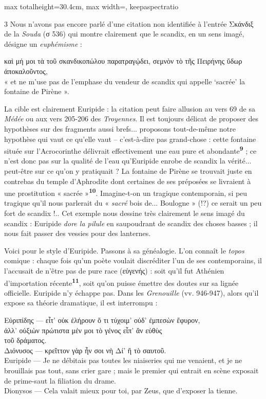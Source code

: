 \documentclass[11pt,twoside]{book}
\newcommand{\italique}[1]{\textit{#1}}
\newcommand{\citComm}[1]{\begin{quoting}[vskip=0.4pt,leftmargin=0.7em,rightmargin=0.2em]#1\end{quoting}}
\newlength{\larg}
\newcommand{\decalage}[1]{\settowidth{\larg}{#1}\hspace*{\larg}}
\newcommand{\marqueur}[1]{\textsuperscript{\color{rubricRed}\textbf{#1}}}
\begin{document}
\begin{adjustbox}{max totalheight=30.4cm, max width=\textwidth, keepaspectratio}
\begin{minipage}{\textwidth}
{\begin{multicols}{3}
\noindent Nous n'avons pas encore parlé d'une citation non identifiée à l'entrée Σκάνδιξ de la \italique{Souda} (σ 536) qui montre clairement que le scandix, en un sens imagé, désigne un \italique{euphémisme} :
\citComm{καὶ μή μοι τὰ τοῦ σκανδικοπώλου παρατραγῴδει, σεμνὸν τὸ τῆς Πειρήνης ὕδωρ ἀποκαλοῦντος,\\
« et ne m'use pas de l'emphase du vendeur de scandix qui appelle `sacrée' la fontaine de Pirène ».}
\par\vspace{1.5pt}
\noindent La cible est clairement Euripide : la citation peut faire allusion au vers 69 de sa \italique{Médée} ou aux vers 205-206 des \italique{Troyennes}. Il est toujours délicat de proposer des hypothèses sur des fragments aussi brefs... proposons tout-de-même notre hypothèse qui vaut ce qu'elle vaut – c'est-à-dire pas grand-chose : cette fontaine située sur l'Acrocorinthe délivrait effectivement une eau pure et abondante\marqueur{9} ; ce n'est donc pas sur la qualité de l'eau qu'Euripide enrobe de scandix la vérité... peut-être sur ce qu'on y pratiquait ? La fontaine de Pirène se trouvait juste en contrebas du temple d'Aphrodite dont certaines de ses préposées se livraient à une prostitution « sacrée »\marqueur{10}. Imagine-t-on un tragique contemporain, si peu tragique qu'il nous parlerait du « \italique{sacré} bois de... Boulogne » (!?) ce serait un peu fort de scandix !.. Cet exemple nous dessine très clairement le sens imagé du scandix : Euripide \italique{dore la pilule} en saupoudrant de scandix des choses basses ; il nous fait passer des vessies pour des lanternes.
\par\vspace{1.5pt}
\noindent Voici pour le style d'Euripide. Passons à sa généalogie. L'on connaît le \italique{topos} comique : chaque fois qu'un poète voulait discréditer l'un de ses contemporains, il l'accusait de n'être pas de pure race (εὐγενής) : soit qu'il fut Athénien d'importation récente\marqueur{11}, soit qu'on puisse émettre des doutes sur sa lignée officielle. Euripide n'y échappe pas. Dans les \italique{Grenouille} (vv. 946-947), alors qu'il expose sa théorie dramatique, il est interrompu :
\citComm{Εὐριπίδης --- εἶτ’ οὐκ ἐλήρουν ὅ τι τύχοιμ’ οὐδ’ ἐμπεσὼν ἔφυρον,\\
ἀλλ’ οὑξιὼν πρώτιστα μέν μοι τὸ γένος εἶπ’ ἂν εὐθὺς\\
τοῦ δράματος.\\
Διόνυσος --- \decalage{τοῦ }κρεῖττον γὰρ ἦν σοι νὴ Δί’ ἢ τὸ σαυτοῦ.\\
Euripide --- Je ne débitais pas toutes les niaiseries qui me venaient, et je ne brouillais pas tout, sans crier gare ;
mais le premier qui entrait en scène exposait de prime-saut la filiation du drame.\\
Dionysos --- Cela valait mieux pour toi, par Zeus, que d'exposer la tienne.}
\par\end{multicols}}
\end{minipage}\end{adjustbox}
\end{document}
